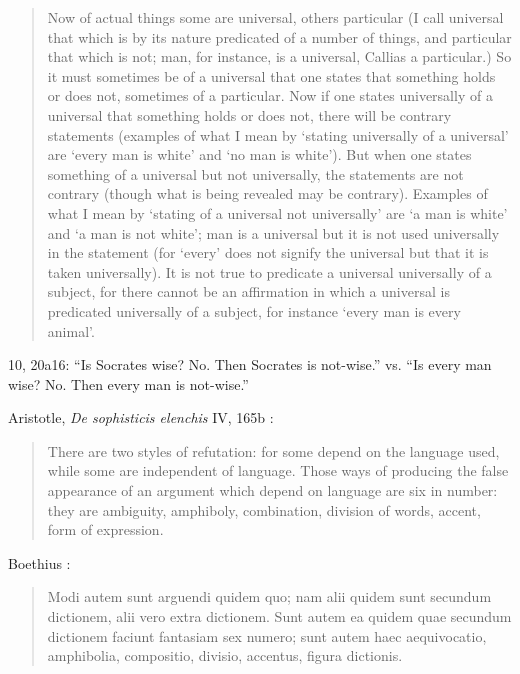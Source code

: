 \documentclass{article}
\begin{document}
\begin{quote}
Now of actual things some are universal, others
particular (I call universal that which is by its nature
predicated of a number of things, and particular that which
is not; man, for instance, is a universal, Callias a particular.)
So it must sometimes be of a universal that one
states that something holds or does not, sometimes of a 
particular. Now if one states universally of a universal that
something holds or does not, there will be contrary statements
(examples of what I mean by `stating universally
of a universal' are `every man is white' and `no man is
white'). But when one states something of a universal but
not universally, the statements are not contrary (though
what is being revealed may be contrary). Examples of
what I mean by `stating of a universal not universally'
are `a man is white' and `a man is not white';  man is
a universal but it is not used universally in the statement
(for `every' does not signify the universal but that it is
taken universally). It is not true to predicate a universal
universally of a subject, for there cannot be an affirmation
in which a universal is predicated universally of a subject,
for instance `every man is every animal'.
\end{quote}



10, 20a16: ``Is Socrates wise? No. Then Socrates is not-wise.'' vs. ``Is every man wise? No. Then
every man is not-wise.'' \cite[p.~56]{ackrill}












Aristotle, {\em De sophisticis elenchis} IV, 165b \cite{pickard-cambridge}:

\begin{quote}
There are two styles of refutation: for some depend on the language used, while some are independent of language. Those ways of producing the false appearance of an argument which depend on language are six in number: they are ambiguity, amphiboly, combination, division of words, accent, form of expression.
\end{quote}

Boethius \cite[p.~8]{ALVI1to3}:

\begin{quote}
Modi autem sunt arguendi quidem quo; nam alii quidem
sunt secundum dictionem, alii vero extra dictionem. Sunt autem
ea quidem quae secundum dictionem faciunt fantasiam sex
numero; sunt autem haec aequivocatio, amphibolia, compositio,
divisio, accentus, figura dictionis.
\end{quote}
\end{document}
